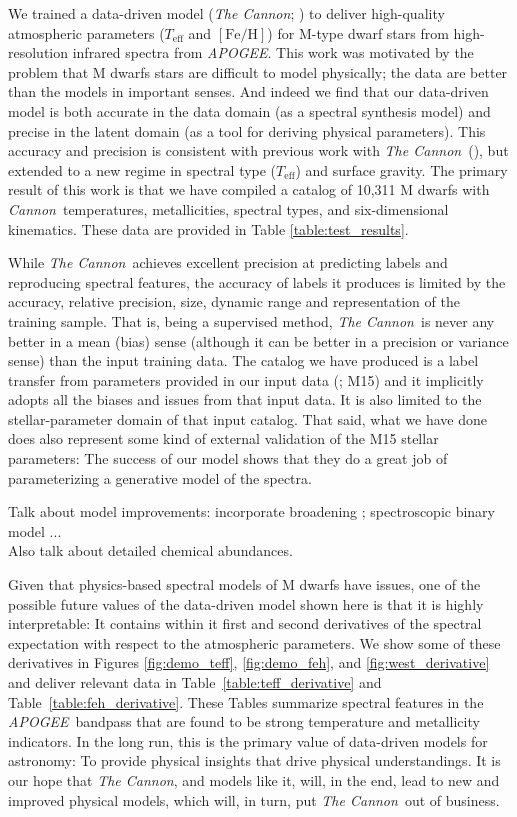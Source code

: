 \documentclass[twocolumn]{aastex62}
\newcommand{\apogee}{\textsl{APOGEE}}
\newcommand{\thecannon}{\textsl{The Cannon}}
\newcommand{\cannon}{\textsl{Cannon}}
\newcommand{\teff}{T_{\mathrm{eff}}}
\newcommand{\feh}{[{\mathrm{Fe}/\mathrm{H}}]}
\begin{document}
We trained a data-driven model (\thecannon; \citealt{Ness:2015}) to deliver
high-quality atmospheric parameters ($\teff$ and $\feh$) for M-type dwarf stars
from high-resolution infrared spectra from \apogee.
This work was motivated by the problem that M dwarfs stars are difficult to
model physically; the data are better than the models in important senses.
And indeed we find that our data-driven model is both accurate in the
data domain (as a spectral synthesis model) and precise in the latent domain
(as a tool for deriving physical parameters).
This accuracy and precision is consistent with previous work with
\thecannon\ (\citealt{Ness:2015, Casey:2016, Ho:2017a, Ness:2018}), but
extended to a new regime in spectral type ($\teff$) and surface
gravity.
The primary result of this work is that
we have compiled a catalog of 10,311 M dwarfs with \cannon\ temperatures,
metallicities, spectral types, and six-dimensional kinematics.
These data are provided in Table \ref{table:test_results}.

While \thecannon\ achieves excellent precision at predicting labels
and reproducing spectral features, the
accuracy of labels it produces is limited by
the accuracy, relative precision, size, dynamic range and
representation of the training sample.
That is, being a supervised method, \thecannon\ is never any better in a mean (bias) sense
(although it can be better in a precision or variance sense) than the input training
data.
The catalog we have produced is a label transfer from parameters provided
in our input data (\citealt{Mann:2015}; M15) and it implicitly adopts all the biases and
issues from that input data.
It is also limited to the stellar-parameter domain of that input catalog.
That said, what we have done does also represent some kind of external validation of the M15
stellar parameters:
The success of our model shows that they do a great job of parameterizing a generative
model of the spectra.

Talk about model improvements: incorporate broadening \citep{Behmard2019}; spectroscopic binary model \citep{ElBadry:2018}... \\

Also talk about detailed chemical abundances.

Given that physics-based spectral models of M dwarfs have issues, one of the possible
future values of the data-driven model shown here is that it is highly interpretable:
It contains within it first and second derivatives of the spectral expectation with
respect to the atmospheric parameters.
We show some of these derivatives in Figures \ref{fig:demo_teff}, \ref{fig:demo_feh}, and \ref{fig:west_derivative} and deliver relevant data in
Table~\ref{table:teff_derivative} and Table~\ref{table:feh_derivative}.
These Tables summarize spectral features in the \apogee\ bandpass
that are found to be strong temperature and metallicity indicators.
In the long run, this is the primary value of data-driven models for astronomy:
To provide physical insights that drive physical understandings.
It is our hope that \thecannon, and models like it, will, in the end, lead to
new and improved physical models, which will, in turn, put \thecannon\ out of business. \\
\end{document}
